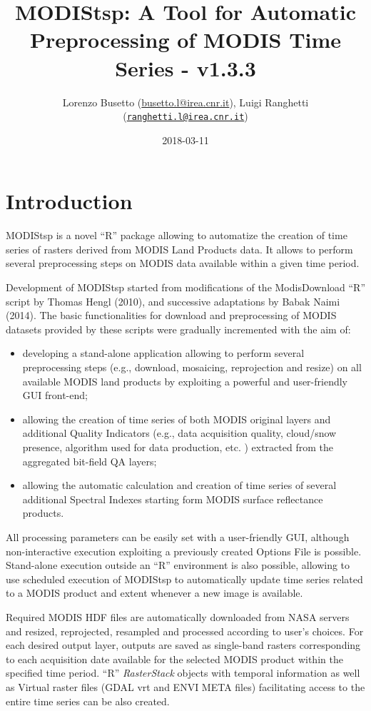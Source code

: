 \documentclass[]{article}
\title{MODIStsp: A Tool for Automatic Preprocessing of MODIS Time Series -
v1.3.3}
\author{Lorenzo Busetto
(\href{mailto:lbusett@gmail.com}{busetto.l@irea.cnr.it}), Luigi
Ranghetti
(\href{mailto:ranghetti.l@irea.cnr.it}{\nolinkurl{ranghetti.l@irea.cnr.it}})}
\date{2018-03-11}
\providecommand{\tightlist}{%
  \setlength{\itemsep}{0pt}\setlength{\parskip}{0pt}}
\begin{document}
\maketitle

{
\hypersetup{linkcolor=black}
\setcounter{tocdepth}{2}
\tableofcontents
}
\section{Introduction}\label{introduction}

MODIStsp is a novel ``R'' package allowing to automatize the creation of
time series of rasters derived from MODIS Land Products data. It allows
to perform several preprocessing steps on MODIS data available within a
given time period.

Development of MODIStsp started from modifications of the ModisDownload
``R'' script by Thomas Hengl (2010), and successive adaptations by Babak
Naimi (2014). The basic functionalities for download and preprocessing
of MODIS datasets provided by these scripts were gradually incremented
with the aim of:

\begin{itemize}
\tightlist
\item
  developing a stand-alone application allowing to perform several
  preprocessing steps (e.g., download, mosaicing, reprojection and
  resize) on all available MODIS land products by exploiting a powerful
  and user-friendly GUI front-end;
\item
  allowing the creation of time series of both MODIS original layers and
  additional Quality Indicators (e.g., data acquisition quality,
  cloud/snow presence, algorithm used for data production, etc. )
  extracted from the aggregated bit-field QA layers;
\item
  allowing the automatic calculation and creation of time series of
  several additional Spectral Indexes starting form MODIS surface
  reflectance products.
\end{itemize}

All processing parameters can be easily set with a user-friendly GUI,
although non-interactive execution exploiting a previously created
Options File is possible. Stand-alone execution outside an ``R''
environment is also possible, allowing to use scheduled execution of
MODIStsp to automatically update time series related to a MODIS product
and extent whenever a new image is available.

Required MODIS HDF files are automatically downloaded from NASA servers
and resized, reprojected, resampled and processed according to user's
choices. For each desired output layer, outputs are saved as single-band
rasters corresponding to each acquisition date available for the
selected MODIS product within the specified time period. ``R''
\emph{RasterStack} objects with temporal information as well as Virtual
raster files (GDAL vrt and ENVI META files) facilitating access to the
entire time series can be also created.
\end{document}
